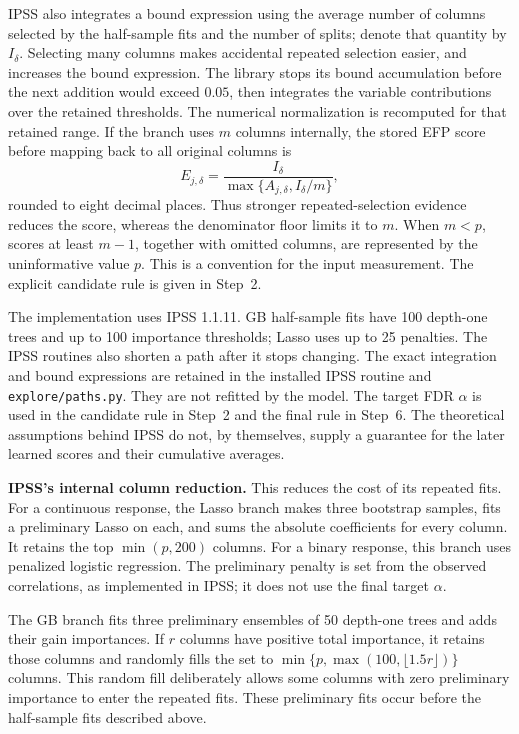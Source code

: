 \documentclass[10pt,letterpaper]{article}
\newcommand{\code}[1]{\nolinkurl{#1}}
\begin{document}
IPSS also integrates a bound expression using the average number of columns
selected by the half-sample fits and the number of splits; denote that
quantity by $I_\delta$. Selecting many columns makes accidental repeated
selection easier, and increases the bound expression. The library stops
its bound accumulation before the next addition would exceed $0.05$,
then integrates the variable contributions over the retained thresholds.
The numerical normalization is recomputed for that retained range.
If the branch uses $m$ columns internally, the stored EFP score before
mapping back to all original columns is
\[
 E_{j,\delta}=\frac{I_\delta}
 {\max\{A_{j,\delta},I_\delta/m\}},
\]
rounded to eight decimal places. Thus stronger repeated-selection evidence
reduces the score, whereas the denominator floor limits it to $m$.
When $m<p$, scores at least $m-1$, together with omitted columns, are
represented by the uninformative value $p$. This is a convention for the
input measurement. The explicit candidate rule is given in Step~2.

The implementation uses IPSS 1.1.11. GB half-sample fits have 100 depth-one
trees and up to 100 importance thresholds; Lasso uses up to 25 penalties.
The IPSS routines also shorten a path after it stops changing. The exact
integration and bound expressions are retained in the installed IPSS
routine and \code{explore/paths.py}. They are not refitted by the model.
The target FDR $\alpha$ is used in the candidate rule in Step~2 and the final rule in Step~6. The theoretical assumptions
behind IPSS do not, by themselves, supply a guarantee for the later learned
scores and their cumulative averages.

\textbf{IPSS's internal column reduction.} This reduces the cost of
its repeated fits. For a continuous response, the Lasso branch makes three
bootstrap samples, fits a preliminary Lasso on each, and sums the absolute
coefficients for every column. It retains the top $\min(p,200)$ columns.
For a binary response, this branch uses penalized logistic regression.
The preliminary penalty is set from the observed correlations, as implemented
in IPSS; it does not use the final target $\alpha$.

The GB branch fits three preliminary ensembles of 50 depth-one trees and
adds their gain importances. If $r$ columns have positive total importance,
it retains those columns and randomly fills the set to
$\min\{p,\max(100,\lfloor1.5r\rfloor)\}$ columns. This random fill deliberately
allows some columns with zero preliminary importance to enter the repeated
fits. These preliminary fits occur before the half-sample fits described
above.
\end{document}
